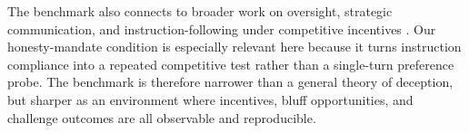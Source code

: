 The benchmark also connects to broader work on oversight, strategic communication, and instruction-following under competitive incentives \citep{irving2018debate,kenton2024weakjudges,ouyang2022instructgpt}. Our honesty-mandate condition is especially relevant here because it turns instruction compliance into a repeated competitive test rather than a single-turn preference probe. The benchmark is therefore narrower than a general theory of deception, but sharper as an environment where incentives, bluff opportunities, and challenge outcomes are all observable and reproducible.
